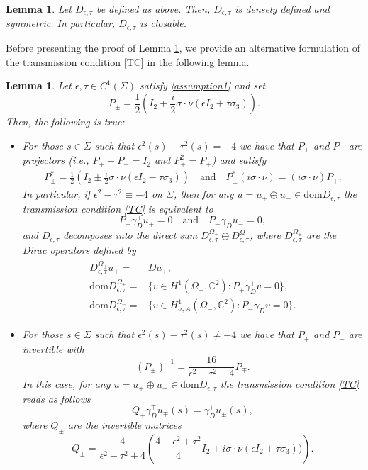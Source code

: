 \documentclass[11pt,a4paper,reqno,oneside]{amsproc}
\DeclareMathOperator{\dom}{dom}
\def \cc {{\mathbb C}}
\numberwithin{equation}{section}
\def\dom{\mathrm{dom}}
\def \cc {{\mathbb{C}}}
\newtheorem{lemma}[definition]{Lemma}
\begin{document}
\begin{lemma}\label{Closable} Let $D_{\epsilon,\tau}$ be defined as above. Then, $D_{\epsilon,\tau}$ is densely defined and symmetric. In particular, $D_{\epsilon,\tau}$ is closable. 
\end{lemma}
Before presenting the proof of Lemma \ref{Closable}, we provide an alternative formulation of the transmission condition \eqref{TC} in the following lemma. 
\begin{lemma}\label{TC_alter} Let $\epsilon,\tau\in C^1(\Sigma)$ satisfy \eqref{assumption1} and set 
\begin{equation*}\label{Projection}
    P_\pm=\frac{1}{2}\left(I_2 \mp \frac{i}{2}\sigma\cdot\nu(\epsilon I_2+\tau\sigma_3) \right).
\end{equation*}
Then, the following is true:  
\begin{itemize}
    \item[(i)] For those $s\in\Sigma$ such that   $\epsilon^2(s)-\tau^2(s)=-4$ we have that  $P_+$ and $P_-$ are projectors (i.e., $P_+ +P_-=I_2$ and $P_\pm^2= P_\pm$) and satisfy 
    \begin{align}\label{P_pm}
   P_\pm^\ast=\frac{1}{2}\left(I_2 \pm \frac{i}{2}\sigma\cdot\nu(\epsilon I_2-\tau\sigma_3) \right)\quad\text{and}\quad   P_\pm^\ast(i\sigma\cdot\nu)=(i\sigma\cdot\nu)P_\mp.
    \end{align}
  In particular, if  $\epsilon^2-\tau^2\equiv-4$ on $\Sigma$, then  for any $u=u_+\oplus u_-\in\dom D_{\epsilon,\tau}$ the transmission condition \eqref{TC} is equivalent to
    \[
    P_+ \gamma_D^+u_+=0 \quad\text{and}\quad  P_- \gamma_D^-u_-=0,
    \]
  and $D_{\epsilon,\tau}$ decomposes into the direct sum $D^{\Omega_+}_{\epsilon,\tau}\oplus D^{\Omega_-}_{\epsilon,\tau}$, where $D^{\Omega_\pm}_{\epsilon,\tau}$ are the Dirac operators defined by
    \begin{align}\label{H_Omega}
		\begin{split}
			D^{\Omega_\pm}_{\epsilon,\tau}u_\pm =& D u_\pm , \\
			\dom D^{\Omega_+}_{\epsilon,\tau} =& \{ v \in  H^1(\Omega_+,\cc^2): P_+ \gamma_D^+v=0  \},\\
            \dom D^{\Omega_-}_{\epsilon,\tau} =& \{ v \in H^1_{\sigma, A}(\Omega_-,\cc^2): P_- \gamma_D^-v=0  \}.
		\end{split}
	\end{align}
    \item[(ii)] For those $s\in\Sigma$ such that   $\epsilon^2(s)-\tau^2(s)\neq-4$ we have that   $P_+$ and $P_-$ are invertible with 
    \[
    (P_\pm)^{-1}=\frac{16}{\epsilon^2-\tau^2+4}P_{\mp}.
    \]
    In this case, for any $u=u_+\oplus u_-\in\dom D_{\epsilon,\tau}$ the transmission condition \eqref{TC} reads as follows
    \[
  Q_\pm \gamma_D^\mp u_\mp(s)=  \gamma_D^\pm u_\pm(s),
    \]
    where $Q_\pm$ are the invertible matrices
    \[
    Q_\pm= \frac{4}{\epsilon^2-\tau^2+4}\left(\frac{4 -\epsilon^2+\tau^2}{4}I_2 \pm i\sigma\cdot\nu(\epsilon I_2+\tau\sigma_3)) \right).
    \]
\end{itemize}
\end{lemma}
\end{document}
